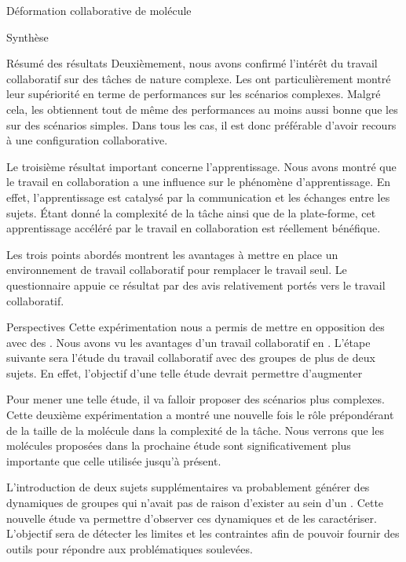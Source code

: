 \documentclass[myfrancais]{mythesis}
\begin{document}
\begin{mychapter}{Déformation collaborative de molécule}
\begin{mysection}{Synthèse}
\begin{mysubsection}{Résumé des résultats}
				Deuxièmement, nous avons confirmé l'intérêt du travail collaboratif sur des tâches de nature complexe.
				Les  ont particulièrement montré leur supériorité en terme de performances sur les scénarios complexes.
				Malgré cela, les  obtiennent tout de même des performances au moins aussi bonne que les  sur des scénarios simples.
				Dans tous les cas, il est donc préférable d'avoir recours à une configuration collaborative.

				Le troisième résultat important concerne l'apprentissage.
				Nous avons montré que le travail en collaboration a une influence sur le phénomène d'apprentissage.
				En effet, l'apprentissage est catalysé par la communication et les échanges entre les sujets.
				Étant donné la complexité de la tâche ainsi que de la plate-forme, cet apprentissage accéléré par le travail en collaboration est réellement bénéfique.

				Les trois points abordés montrent les avantages à mettre en place un environnement de travail collaboratif pour remplacer le travail seul.
				Le questionnaire appuie ce résultat par des avis relativement portés vers le travail collaboratif.
			\end{mysubsection}
			\begin{mysubsection}{Perspectives}
				Cette expérimentation nous a permis de mettre en opposition des  avec des .
				Nous avons vu les avantages d'un travail collaboratif en .
				L'étape suivante sera l'étude du travail collaboratif avec des groupes de plus de deux sujets.
				En effet, l'objectif d'une telle étude devrait permettre d'augmenter 

				Pour mener une telle étude, il va falloir proposer des scénarios plus complexes.
				Cette deuxième expérimentation a montré une nouvelle fois le rôle prépondérant de la taille de la molécule dans la complexité de la tâche.
				Nous verrons que les molécules proposées dans la prochaine étude sont significativement plus importante que celle utilisée jusqu'à présent.

				L'introduction de deux sujets supplémentaires va probablement générer des dynamiques de groupes qui n'avait pas de raison d'exister au sein d'un .
				Cette nouvelle étude va permettre d'observer ces dynamiques et de les caractériser.
				L'objectif sera de détecter les limites et les contraintes afin de pouvoir fournir des outils pour répondre aux problématiques soulevées.


\end{mysubsection}
\end{mysection}
\end{mychapter}
\end{document}
